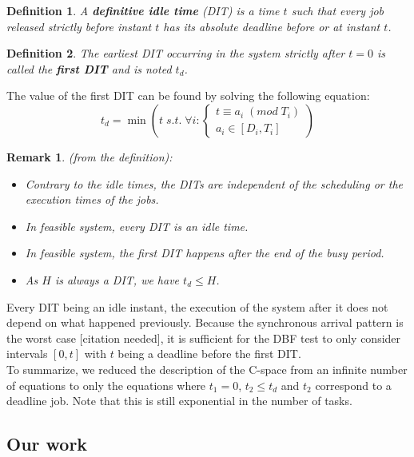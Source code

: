 \documentclass[times, 10pt,twocolumn, a4paper]{article}
\newtheorem{definition}{Definition}
\newtheorem{remark}{Remark}
\begin{document}
\begin{definition}
A \textbf{definitive idle time} (DIT) is a time $t$ such that every job released strictly before instant $t$ has its absolute deadline before or at instant $t$.
\end{definition}

\begin{definition}
The earliest DIT occurring in the system strictly after $t=0$ is called the \textbf{first DIT} and is noted $t_d$.
\end{definition}

The value of the first DIT can be found by solving the following equation:
\[
  t_d = \min \left( t \; s.t. \; \forall i:
  \left\{
  \begin{array}{c}
    t \equiv a_i \; (mod \; T_i) \\
    a_i \in [D_i, T_i]
  \end{array}
  \right.
  \right)
\]

\begin{remark} (from the definition):
	\begin{itemize}
		\item Contrary to the idle times, the DITs are independent of the scheduling or the execution times of the jobs.
		\item In feasible system, every DIT is an idle time.
		\item In feasible system, the first DIT happens after the end of the busy period.
		\item As $H$ is always a DIT, we have $t_d \leq H$.
	\end{itemize}
\end{remark}

Every DIT being an idle instant, the execution of the system after it does not depend on what happened previously. Because the synchronous arrival pattern is the worst case [citation needed], it is sufficient for the DBF test to only consider intervals $[0, t]$ with $t$ being a deadline before the first DIT.\\

To summarize, we reduced the description of the C-space from an infinite number of equations to only the equations where $t_1 = 0$, $t_2 \leq t_d$ and $t_2$ correspond to a deadline job. Note that this is still exponential in the number of tasks.

  \subsection{Our work}
\end{document}
